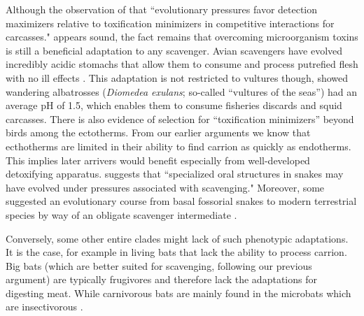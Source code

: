 \documentclass[a4paper,12pt]{article}
\begin{document}
Although the observation of \cite{shivik2006vultures} that ``evolutionary pressures favor detection maximizers relative to toxification minimizers in competitive interactions for carcasses." appears sound, the fact remains that overcoming microorganism toxins is still a beneficial adaptation to any scavenger. 
Avian scavengers have evolved incredibly acidic stomachs that allow them to consume and process putrefied flesh with no ill effects \citep{houston1975digestive,roggenbuck2014microbiome}. 
This adaptation is not restricted to vultures though, \cite{gremillet2012vultures} showed wandering albatrosses (\textit{Diomedea exulans}; so-called ``vultures of the seas'') had an average pH of 1.5, which enables them to consume fisheries discards and squid carcasses. 
There is also evidence of selection for ``toxification minimizers'' beyond birds among the ectotherms.
From our earlier arguments we know that ecthotherms are limited in their ability to find carrion as quickly as endotherms. 
This implies later arrivers would benefit especially from well-developed detoxifying apparatus. 
\cite{shivik2006vultures} suggests that ``specialized oral structures in snakes may have evolved under pressures associated with scavenging."
Moreover, some suggested an evolutionary course from basal fossorial snakes to modern terrestrial species by way of an obligate scavenger intermediate \citep{bauchot2006snakes}. 


Conversely, some other entire clades might lack of such phenotypic adaptations. %
It is the case, for example in living bats that lack the ability to process carrion.
Big bats (which are better suited for scavenging, following our previous argument) are typically frugivores and therefore lack the adaptations for digesting meat.
While carnivorous bats are mainly found in the microbats which are insectivorous \citep{aguirre2003implications}.
\end{document}
